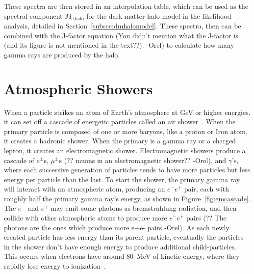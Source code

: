     These spectra are then stored in an interpolation table, which can be used as the spectral component $M_{\textrm{e,halo}}$ for the dark matter halo model in the likelihood analysis, detailed in Section~\ref{subsec:dmhalomodel}.
    These spectra, then can be combined with the {\color{red}J-factor equation (You didn't mention what the J-factor is (and its figure is not mentioned in the text??). -Orel)} to calculate how many gamma rays are produced by the halo.

    \FloatBarrier
    
    
\section{Atmospheric Showers}

  When a particle strikes an atom of Earth's atmosphere at GeV or higher energies, it can set off a cascade of energetic particles called an air shower~\cite{Bethe1934,Klein1999}.
  When the primary particle is composed of one or more baryons, like a proton or Iron atom, it creates a hadronic shower.
  When the primary is a gamma ray or a charged lepton, it creates an electromagnetic shower.
  Electromagnetic showers produce a cascade of $e^{\pm}$s, $\mu^{\pm}$s {\color{red}(?? muons in an electromagnetic shower?? -Orel)}, and $\gamma$'s, where each successive generation of particles tends to have more particles but less energy per particle than the last.
  To start the shower, the primary gamma ray will interact with an atmospheric atom, producing an $e^{-}e^{+}$ pair, each with roughly half the primary gamma ray's energy, as shown in Figure~\ref{fig:emcascade}.
  The $e^{-}$ and $e^{+}$ may emit some photons as bremstrahlung radiation, and then {\color{red}collide with other atmospheric atoms to produce more $e^{-}e^{+}$ pairs (?? The photons are the ones which produce more e+e- pairs -Orel)}.
  As each newly created particle has less energy than its parent particle, eventually the particles in the shower don't have enough energy to produce additional child-particles.
  This occurs when electrons have around \SI{80}{MeV} of kinetic energy, where they rapidly lose energy to ionization~\cite{pdg_2014}.


